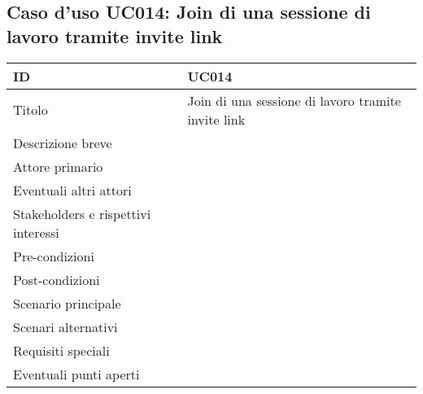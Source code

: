 \documentclass[../../main.tex]{subfiles}
\begin{document}
\subsection{Caso d’uso UC014: Join di una sessione di lavoro tramite invite link }
\begin{tabularx}{150mm}{|l|X|}
    \hline
    ID                                  & \textbf{UC014}\\
    \hline
    Titolo                              & Join di una sessione di lavoro tramite invite link \\
    \hline
    Descrizione breve                   &    \\
    \hline
    Attore primario                     &    \\
    \hline
    Eventuali altri attori              &    \\
    \hline
    Stakeholders e rispettivi interessi &    \\
    \hline
    Pre-condizioni                      &    \\
    \hline
    Post-condizioni                     &    \\
    \hline
    Scenario principale                 &    \\
    \hline
    Scenari alternativi                 &    \\
    \hline
    Requisiti speciali                  &    \\
    \hline
    Eventuali punti aperti              &    \\
    \hline
\end{tabularx}
\newpage
\end{document}
